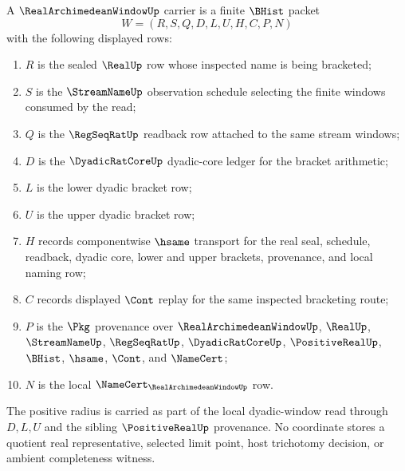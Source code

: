 \begin{definition}
\label{def:real-archimedean-window-carrier}
A $\RealArchimedeanWindowUp$ carrier is a finite $\BHist$ packet
$$
W=(R,S,Q,D,L,U,H,C,P,N)
$$
with the following displayed rows:
\begin{enumerate}
\item $R$ is the sealed $\RealUp$ row whose inspected name is being bracketed;
\item $S$ is the $\StreamNameUp$ observation schedule selecting the finite windows consumed by the read;
\item $Q$ is the $\RegSeqRatUp$ readback row attached to the same stream windows;
\item $D$ is the $\DyadicRatCoreUp$ dyadic-core ledger for the bracket arithmetic;
\item $L$ is the lower dyadic bracket row;
\item $U$ is the upper dyadic bracket row;
\item $H$ records componentwise $\hsame$ transport for the real seal, schedule, readback, dyadic core, lower and upper brackets, provenance, and local naming row;
\item $C$ records displayed $\Cont$ replay for the same inspected bracketing route;
\item $P$ is the $\Pkg$ provenance over $\RealArchimedeanWindowUp$, $\RealUp$, $\StreamNameUp$, $\RegSeqRatUp$, $\DyadicRatCoreUp$, $\PositiveRealUp$, $\BHist$, $\hsame$, $\Cont$, and $\NameCert$;
\item $N$ is the local $\NameCert_{\RealArchimedeanWindowUp}$ row.
\end{enumerate}
The positive radius is carried as part of the local dyadic-window read through $D,L,U$ and the sibling $\PositiveRealUp$ provenance. No coordinate stores a quotient real representative, selected limit point, host trichotomy decision, or ambient completeness witness.
\end{definition}

